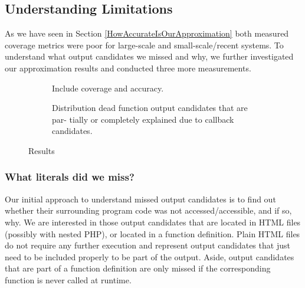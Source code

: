 \documentclass[sigconf]{acmart}
\begin{document}
\subsection{Understanding Limitations} \label{sec:understanding_limitations}
As we have seen in Section \ref{HowAccurateIsOurApproximation} both measured
coverage metrics were poor for large-scale and small-scale/recent systems. To
understand what output candidates we missed and why, we further investigated
our approximation results and conducted three more measurements.

\begin{figure}[h!]
	\begin{subfigure}[center]{0.48\textwidth}
		
		\caption{\label{coverage}}
	\end{subfigure}
	
	\begin{subfigure}[center]{0.48\textwidth}
		
		\caption{
			Include coverage and accuracy.
			\label{fig:include_coverage_results}
		}
	\end{subfigure}
	
	
	\begin{subfigure}[center]{0.48\textwidth}
		
		\caption{
			Distribution dead function output candidates that are par-
			tially or completely explained due to callback candidates.
			\label{fig:output_candidate_explanation}
		}
		
	\end{subfigure}
	\caption{Results}
\end{figure}

\subsubsection{What literals did we miss?}\label{WhatLiteralsDidWeMiss?}
Our initial approach to understand missed output candidates is to find out
whether their surrounding program code was not accessed/accessible, and if so,
why. We are interested in those output candidates that are located in HTML
files (possibly with nested PHP), or located in a function definition. Plain
HTML files do not require any further execution and represent output candidates
that just need to be included properly to be part of the output. Aside, output
candidates that are part of a function definition are only missed if the
corresponding function is never called at runtime.
\end{document}
